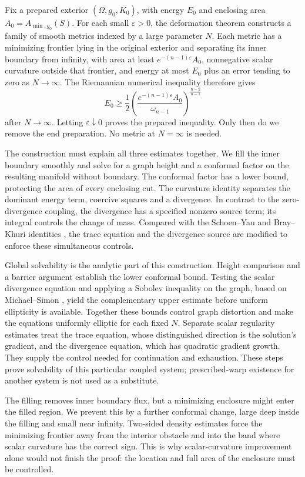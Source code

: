 Fix a prepared exterior $(\Omega,g_0,K_0)$, with energy $E_0$ and
enclosing area $A_0=A_{\min,g_0}(S)$. For each small $\varepsilon>0$,
the deformation theorem constructs a family of smooth metrics indexed
by a large parameter $N$. Each metric has a minimizing frontier lying in the original exterior
and separating its inner boundary from infinity, with area at least
$e^{-(n-1)\varepsilon}A_0$, nonnegative scalar
curvature outside that frontier, and energy at most $E_0$
plus an error tending to zero as $N\to\infty$. The Riemannian numerical
inequality therefore gives
\[
 E_0\geq
 \frac12\left(\frac{e^{-(n-1)\varepsilon}A_0}
 {\omega_{n-1}}\right)^{\frac{n-2}{n-1}}
\]
after $N\to\infty$. Letting $\varepsilon\downarrow0$ proves the
prepared inequality. Only then do we remove the end preparation.
No metric at $N=\infty$ is needed.

The construction must explain all three estimates together. We fill
the inner boundary smoothly and solve for a graph height and a conformal
factor on the resulting manifold without boundary. The conformal
factor has a lower bound, protecting the area of every enclosing cut.
The curvature identity separates the dominant energy term, coercive
squares and a divergence. In contrast to the zero-divergence coupling,
the divergence has a specified nonzero source term; its integral controls
the change of mass. Compared with the Schoen--Yau and Bray--Khuri
identities \cite{SchoenYau1981,BrayKhuri2011}, the trace equation and the
divergence source are modified to enforce these simultaneous controls.

Global solvability is the analytic part of this construction. Height
comparison and a barrier argument establish the lower conformal bound.
Testing the scalar divergence equation and applying a Sobolev inequality
on the graph, based on Michael--Simon \cite{MichaelSimon1973}, yield the
complementary upper estimate before uniform ellipticity is available.
Together these bounds control graph distortion and make the equations
uniformly elliptic for each fixed $N$.
Separate scalar regularity estimates treat the trace equation, whose
distinguished direction is the solution's gradient, and the divergence
equation, which has quadratic gradient growth. They supply the control
needed for continuation and exhaustion. These steps prove solvability
of this particular coupled system; prescribed-warp existence for another
system is not used as a substitute.

The filling removes inner boundary flux, but a minimizing enclosure
might enter the filled region. We prevent this by a further conformal
change, large deep inside the filling and small near infinity. Two-sided
density estimates force the minimizing frontier away from the interior
obstacle and into the band where scalar curvature has the correct sign.
This is why scalar-curvature improvement alone would not finish the
proof: the location and full area of the enclosure must be controlled.

